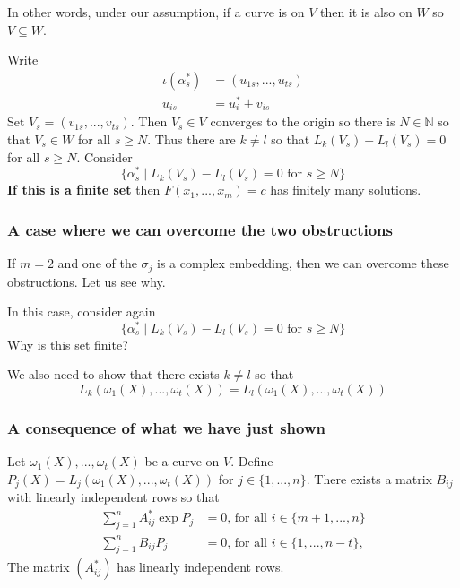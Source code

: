 \documentclass{beamer}
\newcommand{\mfrak}[1]{\mathfrak{#1}}
\newcommand{\mbb}[1]{\mathbb{#1}}
\numberwithin{equation}{section}
\begin{document}
\begin{frame}
	In other words, under our assumption, if a curve is on $V$ then it is also on $W$ so $V \subseteq W$. 
\end{frame}
\begin{frame}
	Write
	\begin{align*}
		\iota(\alpha^*_s) &= (u_{1s}, ..., u_{ts}) \\
		u_{is} &= u_i^* + v_{is}
	\end{align*}
	Set $V_s = (v_{1s}, ..., v_{ts})$. Then $V_s \in V$ converges to the origin so there is $N \in \mbb N$ so that $V_s \in W$ for all $s \geq N$. Thus there are $k \neq l$ so that $L_k(V_s) - L_l(V_s) = 0$ for all $s \geq N$. Consider
	$$\{\alpha^*_s \mid L_k(V_s) - L_l(V_s) = 0 \text{ for } s \geq N \}$$
	\textbf{If this is a finite set} then $F(x_1, ..., x_m) = c$ has finitely many solutions.
\end{frame}

\begin{frame}
	\frametitle{A case where we can overcome the two obstructions}
	If $m = 2$ and one of the $\sigma_j$ is a complex embedding, then we can overcome these obstructions. Let us see why. %
\end{frame}

\begin{frame}
	In this case, consider again
	$$\{\alpha^*_s \mid L_k(V_s) - L_l(V_s) = 0 \text{ for } s \geq N \}$$
	Why is this set finite?
\end{frame}

\begin{frame}
	We also need to show that there exists $k \neq l$ so that $$L_k(\omega_1(X), ..., \omega_t(X)) = L_l(\omega_1(X), ..., \omega_t(X))$$
\end{frame}

\begin{frame}
	\frametitle{A consequence of what we have just shown}
	Let $\omega_1(X), ..., \omega_t(X)$ be a curve on $V$. Define $P_j(X) = L_j(\omega_1(X), ..., \omega_t(X))$ for $j \in \{1, ..., n\}$. There exists a matrix $B_{ij}$ with linearly independent rows so that
	\begin{equation*}
    	\begin{aligned}
        	\sum_{j=1}^n A^*_{ij}\exp P_j & = 0 \text{, for all } i \in \{ m+1, ..., n \} \\
        	\sum_{j=1}^n B_{ij}P_j    	& = 0 \text{, for all } i \in \{1,  ..., n-t\},
    	\end{aligned}
	\end{equation*}
	The matrix $(A^*_{ij})$ has linearly independent rows.
\end{frame}
\end{document}
